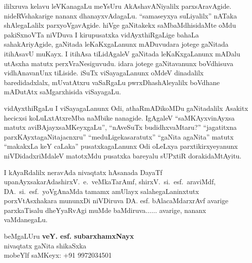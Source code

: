 ililxruva kelavu leVKanagaLu meYsUru AkAshavANiyalilx parxsAravAgide. nideRV\-shakarige nananx dhanayxvAdagaLu. ``samaseyxya suLiyalilx'' nATaka shAlegaLalilx parxyoVga\-vAgide. hiVge gaNitakekx saMbaMdhisidaMte oMdu 
pakiSxnoVTa niVDuva I kirupusatxka vidAyxthiR\-gaLige bahaLa sahakAriyAgide, gaNitada leKaKxgaLanunx mADuvudara jotege gaNitada itihAsavU muKayx. I itihAsa tiLidAgaleV gaNitada leKaKxgaLanunx mADalu utAsxha matutx perxVraNesiguvudu. idara jotege gaNitavanunx boVdhisuva vidhAnavanUnx tiLiside. iSuTx viSayagaLanunx oMdeV dinadalilx baredidadxlalx, mUvatAtxru vaSaRgaLu pwrxDhashAle\-yalilx boVdhane mADutAtx saMgarxhisida viSayagaLu.

vidAyxthiRgaLu I viSayagaLanunx Odi, athaRmADikoMDu gaNitadalilx Asakitx\- hecicxsi\- koLuLxtAtxreMba naMbike nanagide. IgAgaleV ``saMKAyxvinAyxsa matutx aviBAjayx\break saMKeyxgaLu'',  ``nAveSuTx budidhxvaMtaru?'' ``jagatitxna parxKAyxtagaNitajacnxru'' ``meduLige\break kasaratutx'' ``gaNita agaNita'' matutx ``makakxLa keY caLaka'' pusatxkagaLanunx Odi oLeLxya parxtikirxye\-yanunx niVDi\-dadxriMdaleV matotxMdu pusatxka bareyalu sUPxtiR dorakidaMtAyitu.

I kAyaRdalilx neravAda nivaqtatx hAsanada DayaTf upanAyxsakarAda\break shirxV.~e.~veMkaTarAmf, shirxV.~si.~esf.~araviMdf, 
DA.~si.~esf.~yoVgAnaMda tamamx amUlayx salahegaLaninxtutx porxVtAsxhakara mununxDi niVDiruva DA. esf. bAlacaMdarxrAvf avarige parxkaTisalu dheYyaRvAgi muMde baMdiruva$\ldots\ldots$ avarige, nananx vaMdanegaLu.

\begin{flushright}
beMgaLUru \hfill{\bf veY. esf. subarxhamxNayx}\hfill\\
nivaqtatx gaNita shikaSxka\\
mobeYlf saMKeyx: {\rm +91 9972034501}
\end{flushright}






\newpage

